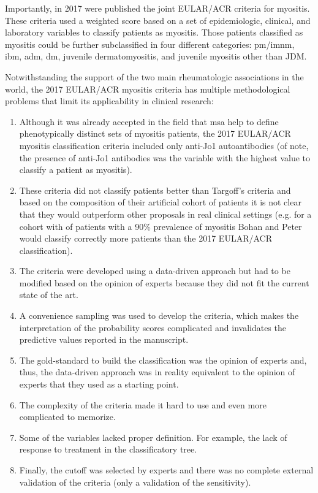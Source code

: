 Importantly, in 2017 were published the joint EULAR/ACR criteria for myositis.\cite{Lundberg2017} These criteria used a weighted score based on a set of epidemiologic, clinical, and laboratory variables to classify patients as myositis. Those patients classified as myositis could be further subclassified in four different categories: \gls{pm}/\gls{imnm}, \gls{ibm}, \gls{adm}, \gls{dm}, juvenile dermatomyositis, and juvenile myositis other than JDM.\cite{Lundberg2017}

Notwithstanding the support of the two main rheumatologic associations in the world, the 2017 EULAR/ACR myositis criteria has multiple methodological problems that limit its applicability in clinical research:

\begin{enumerate}
	\item Although it was already accepted in the field that \gls{msa} help to define phenotypically distinct sets of myositis patients, the 2017 EULAR/ACR myositis classification criteria included only anti-Jo1 autoantibodies (of note, the presence of anti-Jo1 antibodies was the variable with the highest value to classify a patient as myositis).
	
	\item These criteria did not classify patients better than Targoff's criteria and based on the composition of their artificial cohort of patients it is not clear that they would outperform other proposals in real clinical settings (e.g. for a cohort with of patients with a 90\% prevalence of myositis Bohan and Peter would classify correctly more patients than the 2017 EULAR/ACR classification).
	
	\item The criteria were developed using a data-driven approach but had to be modified based on the opinion of experts because they did not fit the current state of the art.
	
	\item A convenience sampling was used to develop the criteria, which makes the interpretation of the probability scores complicated and invalidates the predictive values reported in the manuscript.
	
	\item The gold-standard to build the classification was the opinion of experts and, thus, the data-driven approach was in reality equivalent to the opinion of experts that they used as a starting point.
	
	\item The complexity of the criteria made it hard to use and even more complicated to memorize.
	
	\item Some of the variables lacked proper definition. For example, the lack of response to treatment in the classificatory tree.
	
	\item Finally, the cutoff was selected by experts and there was no complete external validation of the criteria (only a validation of the sensitivity).
\end{enumerate}

